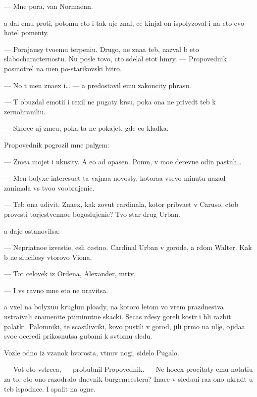 \documentclass[10pt]{book}
\begin{document}
— Mne pora, van Normaenn.

{\Y}a dal {\y}emu pro{\y}ti, potomu cto i tak uje znal, ce{\y} kinjal on ispolyzoval i na cto {\y}evo hotel pomen{\ia}ty.



— Poraja{\y}usy tvo{\y}emu terpeni{\y}u. Drugo{\y}, ne zna{\y}a teb{\ia}, nazval b{\yi} eto slabocharacternost{\y}u. Nu posle tovo, cto sdelal etot hm{\yi}ry. — Propovednik posmotrel na men{\ia} po-starikovski hitro.

— No t{\yi} men{\ia} zna{\y}ex i… — {\Y}a predostavil {\y}emu zakoncity phrasu.

— T{\yi} obuzdal emoti{\y}i i rexil ne pugaty kr{\yi}su, poka ona ne prived{\e}t teb{\ia} k zernohranili{\x}u.

— Skore{\y}e uj zme{\y}u, poka ta ne pokajet, gde {\y}e{\y}o kladka.

Propovednik pogrozil mne paly{\c}em:

— Zme{\y}a mojet i ukusity. A {\y}e{\y}o {\y}ad opasen. Pomn{\io}, v mo{\y}e{\y} derevne odin pastuh…

— Men{\ia} bolyxe interesu{\y}et ta vajna{\y}a novosty, kotora{\y}a vsevo minutu nazad zanimala vs{\e} tvo{\y}o voobrajeni{\y}e.

— Teb{\ia} ona udivit. Zna{\y}ex, kak zovut cardinala, kotor{\yi}{\y} prib{\yi}va{\y}et v Caruso, ctob{\yi} provesti torjestvenno{\y}e bogoslujeni{\y}e? Tvo{\y} star{\yi}{\y} drug Urban.

{\Y}a daje ostanovilsa:

— Nepri{\y}atno{\y}e izvesti{\y}e, {\y}esli cestno. Cardinal Urban v gorode, a r{\ia}dom Walter. Kak b{\yi} ne slucilosy vtorovo Viona.

— Tot celovek iz Ordena, Alexander, m{\e}rtv.

— I vs{\e} ravno mne eto ne nravitsa.

{\Y}a v{\yi}xel na bolyxu{\y}u kruglu{\y}u plo{\x}ady, na kotoro{\y} letom vo vrem{\ia} prazdnestva ustra{\y}ivali znamenit{\yi}{\y}e p{\ia}timinutn{\yi}{\y}e skacki. Se{\y}cas zdesy goreli kostr{\yi} i b{\yi}li razbit{\yi} palatki. Palomniki, te scastlivciki, kovo pustili v gorod, jili pr{\ia}mo na uli{\c}e, ojida{\y}a svo{\y}e{\y} oceredi prikosnutsa gubami k sv{\ia}tomu sledu.

Vozle odno{\y} iz v{\ia}zanok hvorosta, v{\yi}t{\ia}nuv nogi, sidelo Pugalo.

— Vot eto vstreca, — probubnil Propovednik. — Ne hocex procitaty {\y}emu notati{\y}u za to, cto ono razodralo dnevnik burgemeestera? Inace v sledu{\y}u{\x}i{\y} raz ono ukrad{\e}t u teb{\ia} ispodne{\y}e. I spalit na ogne.
\end{document}
